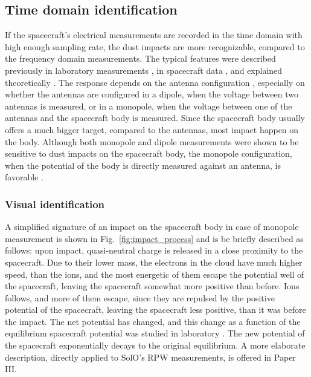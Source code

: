 \subsection{Time domain identification}

If the spacecraft's electrical measurements are recorded in the time domain with high enough sampling rate, the dust impacts are more recognizable, compared to the frequency domain measurements. The typical features were described previously in laboratory measurements \citep{auer1968,nouzak2018laboratory,shen2021laboratory,shen2023variability}, in spacecraft data \citep{zaslavsky2012interplanetary,kellogg2016dust,vaverka2021ion}, and explained theoretically \citep{zaslavsky2015floating,meyer2017frequency,shen2021electrostatic,babic2022analytical}. The response depends on the antenna configuration \citep{shen2023variability,vaverka2021ion}, especially on whether the antennas are configured in a dipole, when the voltage between two antennas is measured, or in a monopole, when the voltage between one of the antennas and the spacecraft body is measured. Since the spacecraft body usually offers a much bigger target, compared to the antennas, most impact happen on the body. Although both monopole and dipole measurements were shown to be sensitive to dust impacts on the spacecraft body, the monopole configuration, when the potential of the body is directly measured against an antenna, is favorable \citep{meyer2014importance,mann2019dust}. 

\subsubsection{Visual identification}

A simplified signature of an impact on the spacecraft body in case of monopole measurement is shown in Fig.~\ref{fig:impact_process} and is be briefly described as follows: upon impact, quasi-neutral charge is released in a close proximity to the spacecraft. Due to their lower mass, the electrons in the cloud have much higher speed, than the ions, and the most energetic of them escape the potential well of the spacecraft, leaving the spacecraft somewhat more positive than before. Ions follows, and more of them escape, since they are repulsed by the positive potential of the spacecraft, leaving the spacecraft less positive, than it was before the impact. The net potential has changed, and this change as a function of the equilibrium spacecraft potential was studied in laboratory \citep{collette2016characteristic,kovcivsvcak2020effective}. The new potential of the spacecraft exponentially decays to the original equilibrium. A more elaborate description, directly applied to SolO's RPW measurements, is offered in Paper III.


